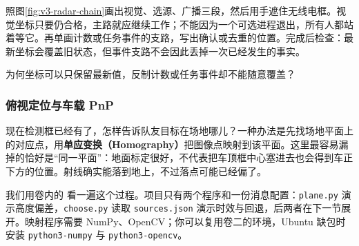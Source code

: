 \begin{example}[把旁路从主路分开]
照图\ref{fig:v3-radar-chain}画出视觉、选源、广播三段，然后用手遮住无线电框。视觉坐标只要仍合格，主路就应继续工作；不能因为一个可选进程退出，所有人都站着等它。再单画计数或任务事件的支路，写出确认或去重的位置。完成后检查：最新坐标会覆盖旧状态，但事件支路不会因此丢掉一次已经发生的事实。
\end{example}

\begin{exercise}
\label{v3-ex-radar-2}
为何坐标可以只保留最新值，反制计数或任务事件却不能随意覆盖？
\end{exercise}

\subsubsection{俯视定位与车载 PnP}

现在检测框已经有了，怎样告诉队友目标在场地哪儿？一种办法是先找场地平面上的对应点，用\textbf{单应变换（Homography）}把图像点映射到该平面。这里最容易漏掉的恰好是“同一平面”：地面标定很好，不代表把车顶框中心塞进去也会得到车正下方的位置。射线确实能落到地上，不过落点可能已经偏了。

我们用卷内的  看一遍这个过程。项目只有两个程序和一份消息配置：\texttt{plane.py} 演示高度偏差，\texttt{choose.py} 读取 \texttt{sources.json} 演示时效与回退，后两者在下一节展开。映射程序需要 NumPy、OpenCV；你可以复用卷二的环境，Ubuntu 缺包时安装 \texttt{python3-numpy} 与 \texttt{python3-opencv}。

